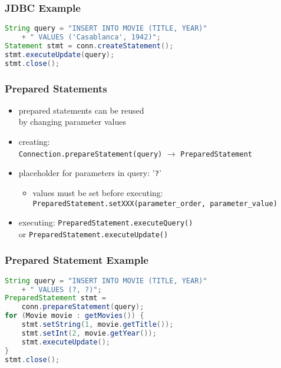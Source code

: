 \documentclass[dvipsnames]{beamer}
\theoremstyle{plain}
\begin{document}
\begin{frame}[fragile]
  \frametitle{JDBC Example}

  \begin{example}[inserting]
    \begin{lstlisting}[language=Java]
String query = "INSERT INTO MOVIE (TITLE, YEAR)"
    + " VALUES ('Casablanca', 1942)";
Statement stmt = conn.createStatement();
stmt.executeUpdate(query);
stmt.close();
    \end{lstlisting}
  \end{example}
\end{frame}

\begin{frame}
  \frametitle{Prepared Statements}

  \begin{itemize}
    \item prepared statements can be reused\\
      by changing parameter values

    \pause
    \medskip
    \item creating:\\
      \lstinline!Connection.prepareStatement(query)!
      $\rightarrow$ \lstinline!PreparedStatement!
    \item placeholder for parameters in query: '\lstinline!?!'
    \begin{itemize}
      \item values must be set before executing:\\
	\lstinline!PreparedStatement.setXXX(parameter_order, parameter_value)!
    \end{itemize}

    \pause
    \medskip
    \item executing: \lstinline!PreparedStatement.executeQuery()!\\
      or \lstinline!PreparedStatement.executeUpdate()!
  \end{itemize}
\end{frame}

\begin{frame}[fragile]
  \frametitle{Prepared Statement Example}

  \begin{example}
    \begin{lstlisting}[language=Java]
String query = "INSERT INTO MOVIE (TITLE, YEAR)"
    + " VALUES (?, ?)";
PreparedStatement stmt =
    conn.prepareStatement(query);
for (Movie movie : getMovies()) {
    stmt.setString(1, movie.getTitle());
    stmt.setInt(2, movie.getYear());
    stmt.executeUpdate();
}
stmt.close();
    \end{lstlisting}
  \end{example}
\end{frame}
\end{document}

